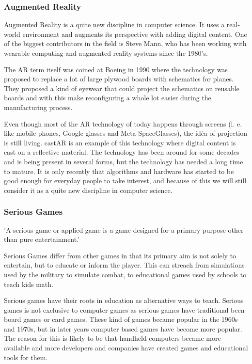 \subsubsection{Augmented Reality}

\gls{Augmented Reality} is a quite new discipline in computer science. It uses
a real-world environment and augments its perspective with adding digital
content. One of the biggest contributors in the field is Steve Mann, who has been
working with wearable computing and augmented reality systems since the 1980's.

The \gls{AR} term itself was coined at Boeing\cite{boeingAR} in 1990 where the
technology was
proposed to replace a lot of large plywood boards with schematics for planes.
They proposed a kind of eyewear that could project the schematics on reusable
boards and with this make reconfiguring a whole lot easier during the
manufacturing process.

Even though most of the AR technology of today happens through screens (i. e. like
mobile phones, Google glasses\cite{GoogleGlasses} and Meta SpaceGlasses\cite{MetaSpaceGlasses}),
the id\'{e}a of projection is still living. castAR is an example of this 
technology where digital content is cast on a reflective material.
The technology has been around for some decades and is being present in several
forms, but the technology has needed a long time to mature. It is only recently
that algorithms and hardware has started to be good enough for everyday people
to take interest, and because of this we will still consider it as a quite new 
discipline in computer science.

\subsubsection{Serious Games}

'A serious game or applied game is a game designed for a primary purpose other than pure entertainment.'\cite{wiki:SeriousGames}

Serious Games differ from other games in that its primary aim is not solely to entertain, but to educate or inform the player.
This can streach from simulations used by the military to simulate combat, to educational games used by schools to teach kids math.

Serious games have their roots in education as alternative ways to teach.
Serious games is not exclusive to computer games as serious games have traditional been board games or card games.
These kind of games became popular in the 1960s and 1970s, but in later years computer based games have become more 
popular. The reason for this is likely to be that handheld computers became more available and more developers and companies have created games and educational tools for them.

